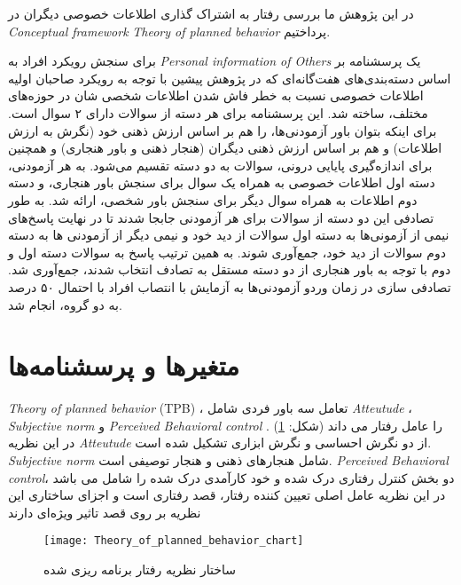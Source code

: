 در این پژوهش ما بررسی رفتار به اشتراک گذاری اطلاعات خصوصی دیگران در
\textit{
  \gls{Conceptual framework}
}
\textit{
  \gls{Theory of planned behavior}
}
پرداختیم.

برای سنجش رویکرد‍ افراد به
\textit{
  \gls{Personal information of Others}
}
یک پرسشنامه بر اساس دسته‌بندی‌های هفت‌گانه‌ای که در پژوهش پیشین با توجه به رویکرد صاحبان
اولیه اطلاعات خصوصی نسبت به خطر فاش شدن اطلاعات شخصی شان در حوزه‌های مختلف، ساخته شد.
این پرسشنامه برای هر دسته از سوالات دارای ۲ سوال است. برای اینکه بتوان باور 
آزمودنی‌ها، را هم بر اساس ارزش ذهنی خود
\!(نگرش به ارزش اطلاعات)
و هم بر اساس ارزش ذهنی دیگران
\!(هنجار ذهنی و باور هنجاری)
و همچنین برای اندازه‌گیری پایایی درونی،
سوالات به دو دسته تقسیم ‌می‌شود.
به هر آزمودنی، دسته اول اطلاعات خصوصی به همراه یک سوال برای سنجش باور هنجاری، و دسته دوم
اطلاعات به همراه سوال دیگر برای سنجش باور شخصی، ارائه شد. به طور تصادفی این دو دسته از 
سوالات برای هر آزمودنی جابجا شدند تا در نهایت پاسخ‌های نیمی از آزمونی‌ها به دسته اول سوالات از دید خود و نیمی 
دیگر از آزمودنی ها به دسته دوم سوالات از دید خود، جمع‌آوری شوند. به همین ترتیب پاسخ به سوالات دسته اول و دوم 
با توجه به باور هنجاری از دو دسته مستقل به تصادف انتخاب شدند، جمع‌آوری شد. تصادفی سازی در زمان وردو آزمودنی‌ها
به آزمایش با انتصاب افراد با احتمال ۵۰ درصد به دو گروه، انجام شد.

\section{متغیر‌ها و پرسشنامه‌ها}

\ifPlennedBahaviorTheory
  \textit{\gls{Theory of planned behavior}}
  \!(TPB)
  ، تعامل سه باور فردی شامل
  \textit{\gls{Atteutude}} ،
  \textit{\gls{Subjective norm}} و
  \textit{\gls{Perceived Behavioral control}}
  را عامل رفتار می داند
  \!(شکل: \ref{fig:Theory_of_planned_behavior_chart})
  \!\cite{ajzenTheoryPlannedBehavior2020}.
  در این نظریه 
  \textit{\gls{Atteutude}}
 از دو نگرش احساسی و نگرش ابزاری تشکیل شده است.
  \textit{\gls{Subjective norm}}
  شامل  هنجارهای ذهنی و هنجار توصیفی است.
  \textit{\gls{Perceived Behavioral control}}،
  دو بخش کنترل رفتاری درک شده و خود کارآمدی درک شده را شامل می باشد
  در این نظریه عامل اصلی تعیین کننده
  رفتار، قصد رفتاری است و اجزای ساختاری این نظریه
  بر روی قصد تاثیر ویژه‌ای دارند
  \cite{mhmdpwrBrrsyTthyrTywry2022}
  \begin{figure}[ht]
    \centerline{\texttt{[image: Theory\_of\_planned\_behavior\_chart]}}
    \caption{ساختار نظریه رفتار برنامه ریزی شده
    }
    \label{fig:Theory_of_planned_behavior_chart}
  \end{figure}\\


